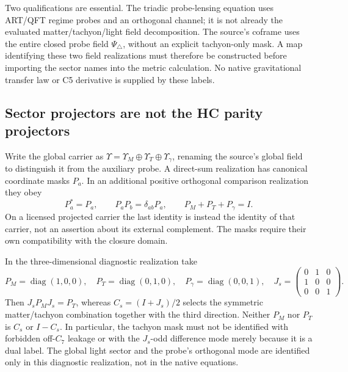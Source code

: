 \documentclass[11pt,a4paper]{article}
\begin{document}
Two qualifications are essential. The triadic probe-lensing equation
uses ART/QFT regime probes and an orthogonal channel; it is not already
the evaluated matter/tachyon/light field decomposition. The source's
coframe uses the entire closed probe field $\Psi_\triangle$, without an
explicit tachyon-only mask. A map identifying these two field realizations
must therefore be constructed before importing the sector names into
the metric calculation. No native gravitational transfer law or C5
derivative is supplied by these labels.

\subsection{Sector projectors are not the HC parity projectors}
Write the global carrier as
$\Upsilon=\Upsilon_M\oplus\Upsilon_T\oplus\Upsilon_\gamma$, renaming
the source's global field to distinguish it from the auxiliary probe.
A direct-sum realization has canonical coordinate masks $P_a$. In an
additional positive orthogonal comparison realization they obey
\[
 P_a^*=P_a,\qquad P_aP_b=\delta_{ab}P_a,\qquad
 P_M+P_T+P_\gamma=I.
\]
On a licensed projected carrier the last identity is instead the
identity of that carrier, not an assertion about its external complement.
The masks require their own compatibility with the closure domain.

In the three-dimensional diagnostic realization take
\[
 P_M=\operatorname{diag}(1,0,0),\quad
 P_T=\operatorname{diag}(0,1,0),\quad
 P_\gamma=\operatorname{diag}(0,0,1),\quad
 J_s=\begin{pmatrix}0&1&0\\1&0&0\\0&0&1\end{pmatrix}.
\]
Then $J_sP_MJ_s=P_T$, whereas $C_s=(I+J_s)/2$ selects the
symmetric matter/tachyon combination together with the third direction.
Neither $P_M$ nor $P_T$ is $C_s$ or $I-C_s$. In particular, the
tachyon mask must not be identified with forbidden off-$C_7$ leakage
or with the $J_s$-odd difference mode merely because it is a dual label.
The global light sector and the probe's orthogonal mode are identified
only in this diagnostic realization, not in the native equations.
\end{document}
